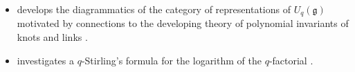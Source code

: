 \documentclass[notitlepage, 10pt]{article}
\begin{document}
\begin{itemize}
\begin{equation*}
            s = e^{h/2}, \qquad
            v = e^{-dh/2} = s^{-d}, \qquad
            x = e^{-h/2d} = s^{-\frac{1}{d}}, \qquad
            q = e^{h} = s^2.
        \end{equation*}
    This is consistent with \cite{reshetikhin1987quantized} in the sense that
    \begin{equation}
        [k] \coloneqq \frac{s^{+k} - s^{-k}}{s^{+1} - s^{-1}} = \frac{q^{+k/2} - q^{-k/2}}{q^{+1/2} - q^{-1/2}}.
    \end{equation}
    \item \citeauthor{reshetikhin1987quantized} develops the diagrammatics of the category of representations of $U_{q}(\mathfrak g)$ motivated by connections to the developing theory of polynomial invariants of knots and links \cite{reshetikhin1987quantized}.
    \item \citeauthor{moak1984q} investigates a $q$-Stirling's formula for the logarithm of the $q$-factorial \cite{moak1984q}.
\end{itemize}
\end{document}
